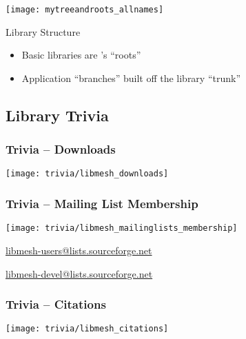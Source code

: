 \begin{frame}[t]


    \begin{minipage}[h]{.6\textwidth}
    \begin{center}
      \texttt{[image: mytreeandroots\_allnames]}
    \end{center}
  \end{minipage}
  \begin{minipage}[h]{.35\textwidth}
    \begin{block}{Library Structure}
      \begin{itemize}
    \item Basic libraries are \LibMesh's ``roots''
    \item Application ``branches'' built off the library ``trunk''
      \end{itemize}
    \end{block}
  \end{minipage}
\end{frame}


\subsection{Library Trivia}
\frame
{
  \frametitle{Trivia -- Downloads}
  \begin{center}
    \texttt{[image: trivia/libmesh\_downloads]}
  \end{center}
}       

\frame
{
  \frametitle{Trivia -- Mailing List Membership}
  \begin{center}
    \texttt{[image: trivia/libmesh\_mailinglists\_membership]}
    
    \small
    
    \url{libmesh-users@lists.sourceforge.net}

    \url{libmesh-devel@lists.sourceforge.net}
  \end{center}
}       

\frame
{
  \frametitle{Trivia -- Citations}
  \begin{center}
    \texttt{[image: trivia/libmesh\_citations]}
  \end{center}
}       


